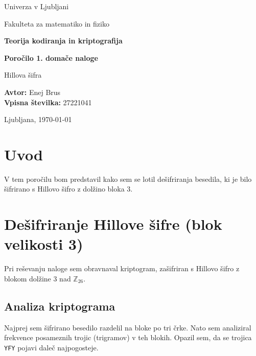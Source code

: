 \documentclass[12pt,a4paper]{article}
\begin{document}
\hypersetup{pageanchor=false}

\begin{titlepage}
	\centering

	{\large Univerza v Ljubljani\par}
	{\large Fakulteta za matematiko in fiziko\par}
	\vspace{2.5cm}

	{\Large\bfseries Teorija kodiranja in kriptografija\par}
	\vspace{0.8cm}
	{\LARGE\bfseries Poročilo 1. domače naloge\par}
	\vspace{0.5cm}
	{\Large Hillova šifra\par}

	\vfill

	\begin{flushleft}
		\textbf{Avtor:} Enej Brus \\
		\textbf{Vpisna številka:} 27221041 \\
	\end{flushleft}

	\vspace{1.2cm}
	{\large Ljubljana, \today\par}
\end{titlepage}

\tableofcontents
\clearpage
\hypersetup{pageanchor=true}
\setcounter{page}{1}

\section{Uvod}
V tem poročilu bom predstavil kako sem se lotil dešifriranja besedila,
 ki je bilo šifrirano s Hillovo šifro z dolžino bloka 3.

\section{Dešifriranje Hillove šifre (blok velikosti 3)}

Pri reševanju naloge sem obravnaval kriptogram, zašifriran s Hillovo šifro z blokom dolžine 3 nad $\mathbb{Z}_{26}$.

\subsection{Analiza kriptograma}

Najprej sem šifrirano besedilo razdelil na bloke po tri črke. Nato sem analiziral frekvence posameznih trojic (trigramov) v teh blokih. Opazil sem, da se trojica \texttt{YFY} pojavi daleč najpogosteje.
\end{document}
